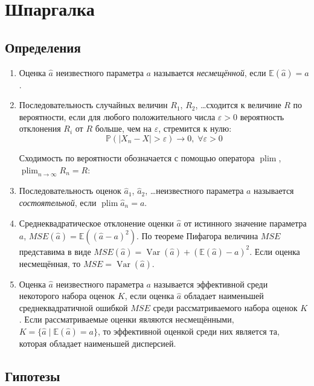 \documentclass[12pt, a4paper]{article}
\DeclareMathOperator{\Var}{Var}
\DeclareMathOperator*{\plim}{plim}
\renewcommand{\P}{\mathbb{P}}
\newcommand{\E}{\mathbb{E}}
\begin{document}
\section{Шпаргалка}

\subsection{Определения}


\begin{enumerate}

  \item Оценка $\hat a$ неизвестного параметра $a$ называется \textit{несмещённой}, если $\E(\hat a) = a$.

  \item Последовательность случайных величин $R_1$, $R_2$, \ldots сходится к величине $R$ по вероятности, если
  для любого положительного числа $\varepsilon >0$ вероятность отклонения $R_i$ от $R$ больше, чем на $\varepsilon$, 
  стремится к нулю:
  \[
  \P(|X_n - X| > \varepsilon ) \to 0, \; \forall \varepsilon > 0
  \]

Сходимость по вероятности обозначается с помощью оператора $\plim$, $\plim_{n\to\infty} R_n = R$:


  \item Последовательность оценок $\hat a_1$, $\hat a_2$, \ldots неизвестного параметра $a$ называется \textit{состоятельной}, если $\plim \hat a_n = a$.

 
\item Среднеквадратическое отклонение оценки $\hat a$ от истинного значение параметра $a$, $MSE(\hat a)=\E((\hat a - a)^2)$. По теореме Пифагора величина $MSE$ представима в виде $MSE(\hat a) = \Var(\hat a) + (\E(\hat a) - a)^2$. Если оценка несмещённая, то $MSE = \Var(\hat a)$.

\item Оценка $\hat a$ неизвестного параметра $a$ называется эффективной среди некоторого набора оценок $K$, 
если оценка $\hat a$ обладает наименьшей среднеквадратичной ошибкой $MSE$ среди рассматриваемого набора оценок $K$. 
Если рассматриваемые оценки являются несмещёнными, $K = \{\hat a \mid \E(\hat a) = a\}$, 
то эффективной оценкой среди них является та, которая обладает наименьшей дисперсией.

\end{enumerate}


\subsection{Гипотезы}
\end{document}
